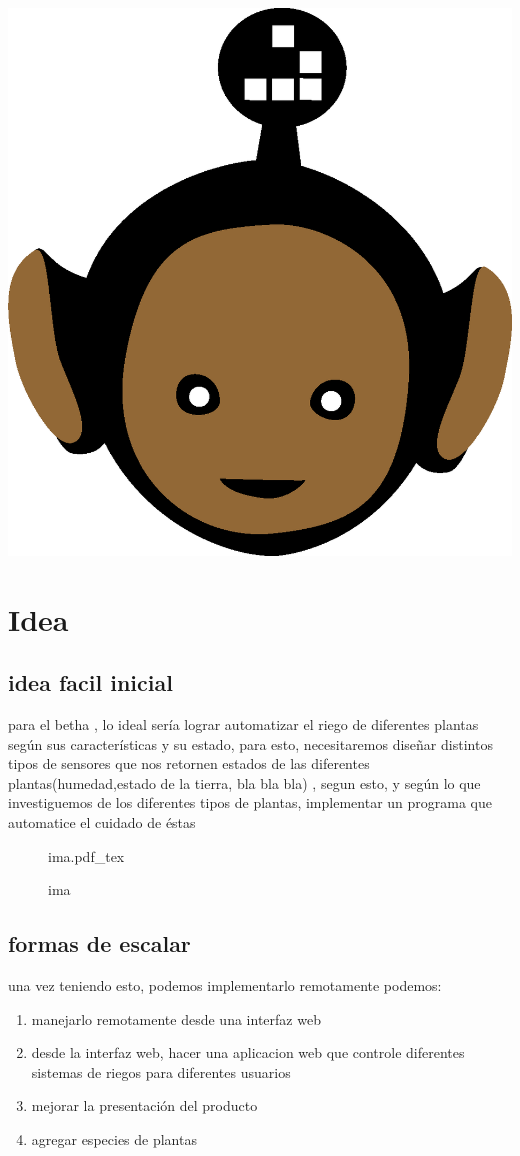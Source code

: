 \documentclass[10pt,a4paper]{article} %
\newcommand{\incfig}[1]{%
    \def\svgwidth{\columnwidth}
    {#1.pdf_tex}
}
\begin{document}
    \title{\rmfamily\normalfont{}}
    \author{}
    \date{\today}

    \maketitle


    \includegraphics[width=0.1\linewidth]{negro_cara.png}
    \section{Idea}
        \subsection{idea facil inicial}
        para el betha , lo ideal sería lograr automatizar el riego de
        diferentes plantas según sus características y su estado, para esto,
        necesitaremos diseñar distintos tipos de sensores que nos retornen
        estados de las diferentes plantas(humedad,estado de la tierra, bla bla
        bla) , segun esto, y según lo que investiguemos de los diferentes tipos
        de plantas, implementar un programa que automatice el cuidado de éstas
        \begin{figure}[ht]
            \centering
            \incfig{ima}
            \caption{ima}
            \label{fig:ima}
        \end{figure}
        \subsection{formas de escalar}
            una vez teniendo esto, podemos implementarlo remotamente podemos:
            \begin{enumerate}
                \item {manejarlo remotamente desde una interfaz web}
                \item {desde la interfaz web, hacer una aplicacion web que
                    controle diferentes sistemas de riegos para diferentes
                usuarios}
                \item {mejorar la presentación del producto}
                \item {agregar especies de plantas}

            \end{enumerate}













    \nocite{*}
    
    
\end{document}
